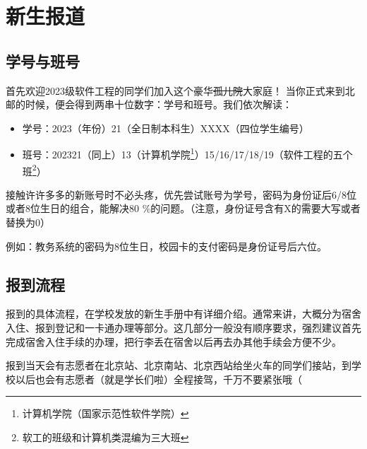 \section{新生报道}

\subsection{学号与班号}

首先欢迎2023级软件工程的同学们加入这个豪华\sout{孤儿院}大家庭！
当你正式来到北邮的时候，便会得到两串十位数字：学号和班号。我们依次解读：
\begin{itemize}
    \itshape
    \item 学号：2023（年份）21（全日制本科生）XXXX（四位学生编号）
    \item 班号：202321（同上）13（计算机学院\footnote{计算机学院（国家示范性软件学院）}）15/16/17/18/19（软件工程的五个班\footnote{软工的班级和计算机类混编为三大班}）
\end{itemize}

接触许许多多的新账号时不必头疼，优先尝试账号为学号，密码为身份证后6/8位或者8位生日的组合，能解决80 \%的问题。（注意，身份证号含有X的需要大写或者替换为0）

例如：教务系统的密码为8位生日，校园卡的支付密码是身份证号后六位。

\subsection{报到流程}

报到的具体流程，在学校发放的新生手册中有详细介绍。通常来讲，大概分为宿舍入住、报到登记和一卡通办理等部分。这几部分一般没有顺序要求，强烈建议首先完成宿舍入住手续的办理，把行李丢在宿舍以后再去办其他手续会方便不少。

报到当天会有志愿者在北京站、北京南站、北京西站给坐火车的同学们接站，到学校以后也会有志愿者（就是学长们啦）全程接驾，千万不要紧张哦（
